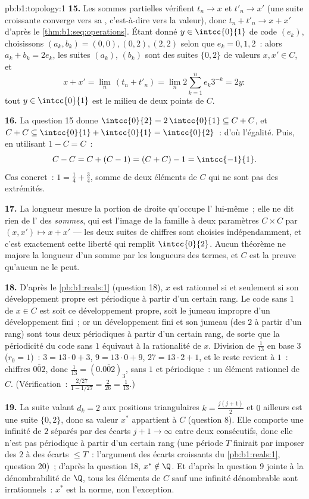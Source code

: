 \begin{solution}{pb:b1:topology:1}
\textbf{15.} Les sommes partielles vérifient $t_n \to x$ et
$t'_n \to x'$ (une suite croissante converge vers sa , c'est-à-dire vers la valeur), donc $t_n + t'_n \to x + x'$
d'après le \cref{thm:b1:seq:operations}. Étant donné $y \in
\intcc{0}{1}$ de code $(e_k)$, choisissons $(a_k, b_k) = (0,0),
(0,2), (2,2)$ selon que $e_k = 0, 1, 2$~: alors $a_k + b_k = 2e_k$,
les suites $(a_k)$, $(b_k)$ sont des suites $\{0,2\}$ de valeurs $x,
x' \in C$, et
\[
x + x' = \lim_n\,(t_n + t'_n) = \lim_n 2\sum_{k=1}^n e_k 3^{-k}
= 2y :
\]
tout $y \in \intcc{0}{1}$ est le milieu de deux points de $C$.

\textbf{16.} La question 15 donne $\intcc{0}{2} = 2\,\intcc{0}{1}
\subseteq C + C$, et $C + C \subseteq \intcc{0}{1} +
\intcc{0}{1} = \intcc{0}{2}$~: d'où l'égalité. Puis, en utilisant
$1 - C = C$~:
\[
C - C = C + (C - 1) = (C + C) - 1 = \intcc{-1}{1} .
\]
Cas concret~: $1 = \frac14 + \frac34$, somme de deux éléments de $C$
qui ne sont pas des extrémités.

\textbf{17.} La longueur mesure la portion de droite qu'occupe
l' lui-même~; elle ne dit rien de l' des
\emph{sommes}, qui est l'image de la famille à deux paramètres
$C \times C$ par $(x, x') \mapsto x + x'$ --- les deux suites de
chiffres sont choisies indépendamment, et c'est exactement cette
liberté qui remplit $\intcc{0}{2}$. Aucun théorème ne majore la
longueur d'un  somme par les longueurs des termes, et $C$ est
la preuve qu'aucun ne le peut.

\textbf{18.} D'après le \cref{pb:b1:reals:1} (question 18), $x$ est
rationnel si et seulement si son développement propre est périodique
à partir d'un certain rang. Le code sans $1$ de $x \in C$ est soit ce
développement propre, soit le jumeau impropre d'un développement
fini~; or un développement fini et son jumeau (des $2$ à partir d'un
rang) sont tous deux périodiques à partir d'un certain rang, de sorte
que la périodicité du code sans $1$ équivaut à la rationalité de $x$.
Division de $\frac1{13}$ en base $3$ ($r_0 = 1$)~: $3 = 13\cdot0 +
3$, $9 = 13\cdot0 + 9$, $27 = 13\cdot2 + 1$, et le reste revient à
$1$~: chiffres $\overline{002}$, donc $\frac1{13} =
(0.\overline{002})_3$, sans $1$ et périodique~: un élément rationnel
de $C$. (Vérification~: $\frac{2/27}{1 - 1/27} = \frac{2}{26} =
\frac1{13}$.)

\textbf{19.} La suite valant $d_k = 2$ aux positions triangulaires
$k = \frac{j(j+1)}{2}$ et $0$ ailleurs est une suite $\{0,2\}$, donc
sa valeur $x^*$ appartient à $C$ (question 8). Elle comporte une
infinité de $2$ séparés par des écarts $j + 1 \to \infty$ entre deux
consécutifs, donc elle n'est pas périodique à partir d'un certain
rang (une période $T$ finirait par imposer des $2$ à des écarts
$\leq T$~: l'argument des écarts croissants du \cref{pb:b1:reals:1},
question 20)~; d'après la question 18, $x^* \notin \Q$. Et d'après la
question 9 jointe à la dénombrabilité de $\Q$, tous les éléments de
$C$ sauf une infinité dénombrable sont irrationnels~: $x^*$ est la
norme, non l'exception.


\end{solution}
